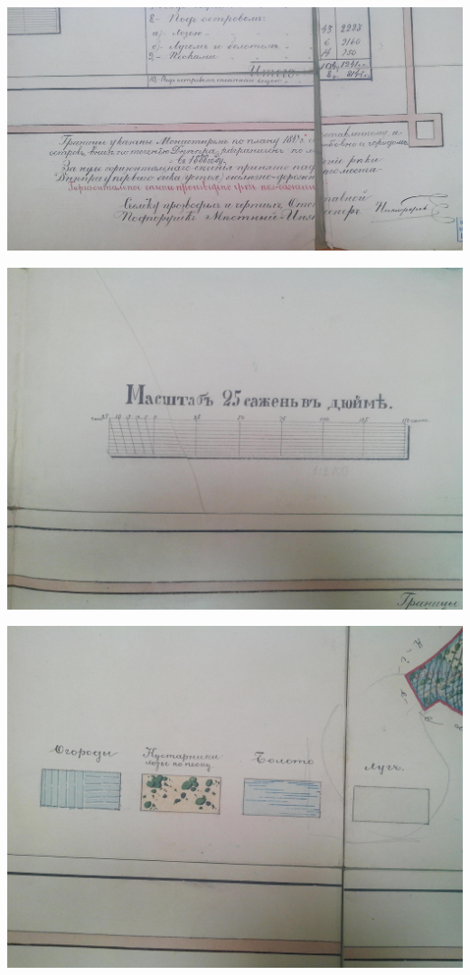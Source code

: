 \begin{center}
\includegraphics[width=\linewidth]{chast-vosp/zver/IMG_20170627_154031.jpg}
\end{center}


\begin{center}
\includegraphics[width=\linewidth]{chast-vosp/zver/IMG_20170627_154035.jpg}
\end{center}

\vspace*{\fill}

\newpage

\begin{center}
\includegraphics[width=\linewidth]{chast-vosp/zver/IMG_20170627_154039.jpg}
\end{center}


